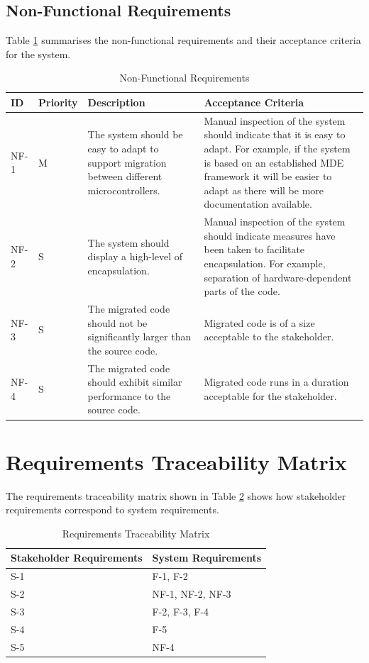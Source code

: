 \documentclass{UoYCSproject}
\newcommand{\ra}[1]{\renewcommand{\arraystretch}{#1}}
\begin{document}
\subsection{Non-Functional Requirements}
Table \ref{table:non_func_req} summarises the non-functional requirements and their acceptance criteria for the system.
\begin{table}[h!]\centering
\ra{1.3}
  \begin{tabular}{@{}p{}p{}p{}p{}@{}} \toprule 
  \textbf{ID} & \textbf{Priority} & \textbf{Description} & \textbf{Acceptance Criteria} \\
  \midrule
  NF-1 & M & The system should be easy to adapt to support migration between different microcontrollers. & Manual inspection of the system should indicate that it is easy to adapt. For example, if the system is based on an established MDE framework it will be easier to adapt as there will be more documentation available. \\
  NF-2 & S & The system should display a high-level of encapsulation. & Manual inspection of the system should indicate measures have been taken to facilitate encapsulation. For example, separation of hardware-dependent parts of the code. \\
  NF-3 & S & The migrated code should not be significantly larger than the source code. & Migrated code is of a size acceptable to the stakeholder. \\
  NF-4 & S & The migrated code should exhibit similar performance to the source code. & Migrated code runs in a duration acceptable for the stakeholder. \\
  
  \bottomrule
  \end{tabular}
\caption{Non-Functional Requirements}
\label{table:non_func_req}
\end{table}

\newpage
\section{Requirements Traceability Matrix}
The requirements traceability matrix shown in Table \ref{table:traceability} shows how stakeholder requirements correspond to system requirements.
\begin{table}[h!]\centering
\ra{1.3}
  \begin{tabular}{@{}p{}p{}@{}} \toprule 
  \textbf{Stakeholder Requirements} & \textbf{System Requirements} \\
  \midrule
  S-1 & F-1, F-2 \\
  S-2 & NF-1, NF-2, NF-3 \\
  S-3 & F-2, F-3, F-4 \\
  S-4 & F-5 \\
  S-5 & NF-4 \\
  \bottomrule
  \end{tabular}
\caption{Requirements Traceability Matrix}
\label{table:traceability}
\end{table}
\end{document}
